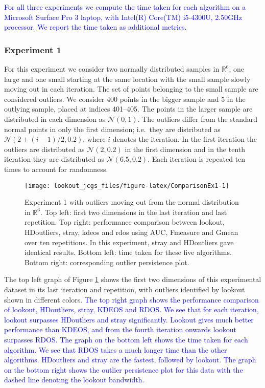 \documentclass[12pt]{article}
\theoremstyle{definition}
\theoremstyle{definition}
\theoremstyle{definition}
\theoremstyle{definition}
\theoremstyle{remark}
\begin{document}
\textcolor{blue}{For all three experiments we compute the time taken for each algorithm on a Microsoft Surface Pro 3 laptop, with Intel(R) Core(TM) i5-4300U, 2.50GHz processor. We report the time taken as additional metrics.}

\hypertarget{experiment-1}{%
\subsubsection*{Experiment 1}\label{experiment-1}}

For this experiment we consider two normally distributed samples in \(\mathbb{R}^6\); one large and one small starting at the same location with the small sample slowly moving out in each iteration. The set of points belonging to the small sample are considered outliers. We consider 400 points in the bigger sample and 5 in the outlying sample, placed at indices 401--405. The points in the larger sample are distributed in each dimension as \(\mathcal{N}(0, 1)\). The outliers differ from the standard normal points in only the first dimension; i.e.~they are distributed as \(\mathcal{N}\left(2 + (i-1)/2, 0.2 \right)\), where \(i\) denotes the iteration. In the first iteration the outliers are distributed as \(\mathcal{N}\left(2, 0.2 \right)\) in the first dimension and in the tenth iteration they are distributed as \(\mathcal{N}\left(6.5, 0.2 \right)\). Each iteration is repeated ten times to account for randomness.

\begin{figure}

{\centering \texttt{[image: lookout\_jcgs\_files/figure-latex/ComparisonEx1-1]} 

}

\caption{Experiment 1 with outliers moving out from the normal distribution in $\mathbb{R}^6$. Top left: first two dimensions in the last iteration and last repetition. Top right: performance comparison between lookout, HDoutliers, stray, kdeos and rdos using AUC, Fmeasure and Gmean over ten repetitions. In this experiment, stray and HDoutliers gave identical results. Bottom left: time taken for these five algorithms. Bottom right: corresponding outlier persistence plot.}\label{fig:ComparisonEx1}
\end{figure}

The top left graph of Figure \ref{fig:ComparisonEx1} shows the first two dimensions of this experimental dataset in its last iteration and repetition, with outliers identified by lookout shown in different colors.
\textcolor{blue}{The top right graph shows the performance comparison of lookout, HDoutliers, stray, KDEOS and RDOS. We see that for each iteration, lookout surpasses HDoutliers and stray significantly. Lookout gives much better performance than KDEOS, and from the fourth iteration onwards lookout surpasses RDOS. The graph on the bottom left shows the time taken for each algorithm. We see that RDOS takes a much longer time than the other algorithms. HDoutliers and stray are the fastest, followed by lookout. The graph on the bottom right shows the outlier persistence plot for this data with the dashed line denoting the lookout bandwidth.}
\end{document}
